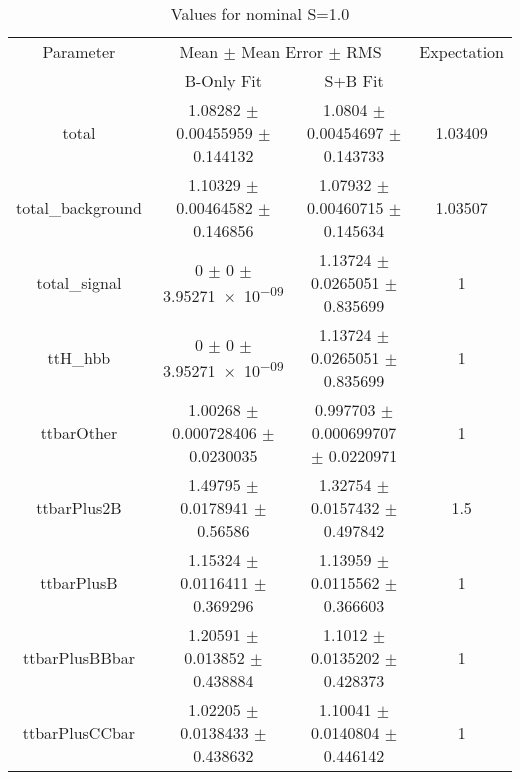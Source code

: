 \begin{table}
\centering
\caption{Values for nominal S=1.0}
\begin{tabular}{cccc}
\toprule
Parameter & \multicolumn{2}{c}{Mean $\pm$ Mean Error $\pm$ RMS} & Expectation\\
 & B-Only Fit & S+B Fit & \\
\midrule
total & \num{1.08282} $\pm$ \num{0.00455959} $\pm$ \num{0.144132} & \num{1.0804} $\pm$ \num{0.00454697} $\pm$ \num{0.143733} & \num{1.03409}\\
total\_background & \num{1.10329} $\pm$ \num{0.00464582} $\pm$ \num{0.146856} & \num{1.07932} $\pm$ \num{0.00460715} $\pm$ \num{0.145634} & \num{1.03507}\\
total\_signal & \num{0} $\pm$ \num{0} $\pm$ \num{3.95271e-09} & \num{1.13724} $\pm$ \num{0.0265051} $\pm$ \num{0.835699} & \num{1}\\
ttH\_hbb & \num{0} $\pm$ \num{0} $\pm$ \num{3.95271e-09} & \num{1.13724} $\pm$ \num{0.0265051} $\pm$ \num{0.835699} & \num{1}\\
ttbarOther & \num{1.00268} $\pm$ \num{0.000728406} $\pm$ \num{0.0230035} & \num{0.997703} $\pm$ \num{0.000699707} $\pm$ \num{0.0220971} & \num{1}\\
ttbarPlus2B & \num{1.49795} $\pm$ \num{0.0178941} $\pm$ \num{0.56586} & \num{1.32754} $\pm$ \num{0.0157432} $\pm$ \num{0.497842} & \num{1.5}\\
ttbarPlusB & \num{1.15324} $\pm$ \num{0.0116411} $\pm$ \num{0.369296} & \num{1.13959} $\pm$ \num{0.0115562} $\pm$ \num{0.366603} & \num{1}\\
ttbarPlusBBbar & \num{1.20591} $\pm$ \num{0.013852} $\pm$ \num{0.438884} & \num{1.1012} $\pm$ \num{0.0135202} $\pm$ \num{0.428373} & \num{1}\\
ttbarPlusCCbar & \num{1.02205} $\pm$ \num{0.0138433} $\pm$ \num{0.438632} & \num{1.10041} $\pm$ \num{0.0140804} $\pm$ \num{0.446142} & \num{1}\\
\bottomrule
\end{tabular}
\end{table}